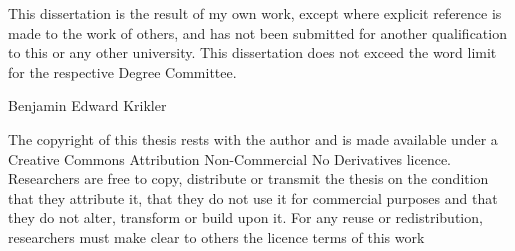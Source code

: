 \begin{declaration}
  This dissertation is the result of my own work, except where explicit
  reference is made to the work of others, and has not been submitted
  for another qualification to this or any other university. This
  dissertation does not exceed the word limit for the respective Degree
  Committee.
  \vspace*{0.5cm}
  \begin{flushright}
	Benjamin Edward Krikler
  \end{flushright}
  \vspace*{6cm}
The copyright of this thesis rests with the author and is made available under
a Creative Commons Attribution Non-Commercial No Derivatives licence.  Researchers
are free to copy, distribute or transmit the thesis on the condition that they
attribute it, that they do not use it for commercial purposes and that they do not
alter, transform or build upon it. For any reuse or redistribution, researchers
must make clear to others the licence terms of this work
\end{declaration}


